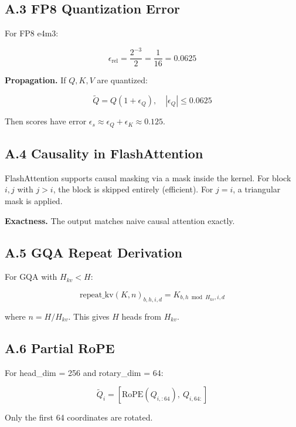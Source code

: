 \subsection{A.3 FP8 Quantization Error}

For FP8 e4m3:

\[
\epsilon_{\text{rel}} = \frac{2^{-3}}{2} = \frac{1}{16} = 0.0625
\tag{A.6}
\]

\textbf{Propagation.} If $Q, K, V$ are quantized:

\[
\tilde{Q} = Q(1 + \epsilon_Q), \quad |\epsilon_Q| \leq 0.0625
\tag{A.7}
\]

Then scores have error $\epsilon_s \approx \epsilon_Q + \epsilon_K \approx 0.125$.

\subsection{A.4 Causality in FlashAttention}

FlashAttention supports causal masking via a mask inside the kernel. For 
block $i, j$ with $j > i$, the block is skipped entirely (efficient). For 
$j = i$, a triangular mask is applied.

\textbf{Exactness.} The output matches naive causal attention exactly.

\subsection{A.5 GQA Repeat Derivation}

For GQA with $H_{kv} < H$:

\[
\text{repeat\_kv}(K, n)_{b, h, i, d} = K_{b, h \bmod H_{kv}, i, d}
\tag{A.8}
\]

where $n = H / H_{kv}$. This gives $H$ heads from $H_{kv}$.

\subsection{A.6 Partial RoPE}

For head\_dim = 256 and rotary\_dim = 64:

\[
\tilde{Q}_i = [\text{RoPE}(Q_{i, :64}), \ Q_{i, 64:}]
\tag{A.9}
\]

Only the first 64 coordinates are rotated.